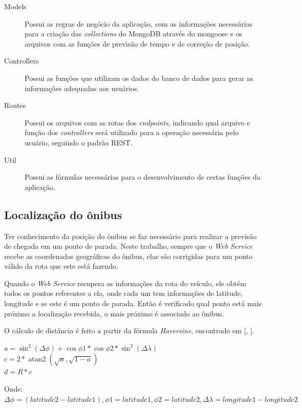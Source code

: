 \documentclass[
	12pt,				%
	oneside,			%
	a4paper,			%
	brazil				%
]{abntex2}
\DeclareMathOperator{\atantwo}{atan2}
\newcommand{\citecustom}[1]{[\citeauthoronline{#1}, \citeyear{#1}]}
\begin{document}
\begin{description}
\item[Models] Possui as regras de negócio da aplicação, com as informações necessárias para a criação das \textit{collections} do MongoDB através do mongoose e os arquivos com as funções de previsão de tempo e de correção de posição.
\item[Controllers] Possui as funções que utilizam os dados do banco de dados para gerar as informações adequadas aos usuários.
\item[Routes] Possui os arquivos com as rotas dos \textit{endpoints}, indicando qual arquivo e função dos \textit{controllers} será utilizado para a operação necessária pelo usuário, seguindo o padrão REST.
\item[Util] Possui as fórmulas necessárias para o desenvolvimento de certas funções da aplicação. 
\end{description}

\subsection{Localização do ônibus}

Ter conhecimento da posição do ônibus se faz necessário para realizar a previsão de chegada em um ponto de parada. Neste trabalho, sempre que o \textit{Web Service} recebe as coordenadas geográficas do ônibus, elas são corrigidas para um ponto válido da rota que este está fazendo.

Quando o \textit{Web Service} recupera as informações da rota do veículo, ele obtém todos os pontos referentes a ela, onde cada um tem informações de latitude, longitude e se este é um ponto de parada. Então é verificado qual ponto está mais próximo a localização recebida, o mais próximo é associado ao ônibus.

O cálculo de distância é feito a partir da fórmula \textit{Haversine}, encontrado em \citecustom{movablescripts}.

\begin{center}

$ a = \sin^2(\Delta\phi) + \cos\phi1 * \cos\phi2 * \sin^2(\Delta\lambda) $  \\
$ c = 2 * \atantwo(\sqrt{a},\sqrt{1 - a}) $ \\
$ d = R * c $ 

\end{center}

Onde: $ \Delta\phi = (latitude2 - latitude1), \phi1 = latitude1, \phi2 = latitude2, \Delta\lambda = longitude1 - longitude2 $ 
\end{document}
